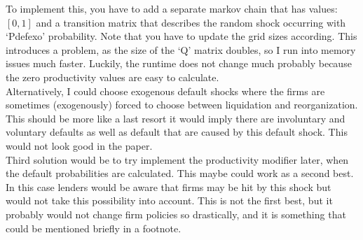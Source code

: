 \documentclass[12pt]{article}
\begin{document}
To implement this, you have to add a separate markov chain that has values: $[0,1]$ and a transition matrix that describes the random shock occurring with `Pdefexo' probability.  Note that you have to update the grid sizes according. This introduces a problem, as the size of the `Q' matrix doubles, so I run into memory issues much faster. Luckily, the runtime does not change much probably because the zero productivity values are easy to calculate.  \vspace{3mm} \\
Alternatively, I could choose exogenous default shocks where the firms are sometimes (exogenously) forced to choose between liquidation and reorganization. This should be more like a last resort it would imply there are involuntary and voluntary defaults as well as default that are caused by this default shock. This would not look good in the paper. \vspace{3mm} \\
Third solution would be to try implement the productivity modifier later, when the default probabilities are calculated. This maybe could work as a second best. In this case lenders would be aware that firms may be hit by this shock but would not take this possibility into account. This is not the first best, but it probably would not change firm policies so drastically, and it is something that could be mentioned briefly in a footnote. 
\end{document}
